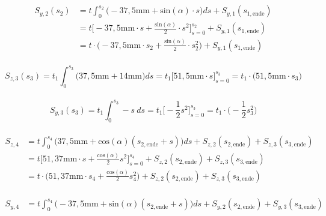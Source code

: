 \begin{itemize}
\begin{equation}
\begin{split}
	\end{split}
\end{equation}\\
\begin{equation}
	\begin{split}
		S_{y,2}(s_2) &= t\int_{0}^{s_2}\bigg(-37,5\mathrm{mm}+\mathrm{sin}(\alpha)\cdot s\bigg)ds + S_{y,1}(s_{1,\mathrm{ende}}) \\\
		&= t\bigg[-37,5\mathrm{mm}\cdot s +\frac{\mathrm{sin}(\alpha)}{2}\cdot s^2\bigg]_{s=0}^{s_2} + S_{y,1}(s_{1,\mathrm{ende}})\\\
		&= t\cdot\bigg(-37,5\mathrm{mm}\cdot s_2 +\frac{\mathrm{sin}(\alpha)}{2}\cdot s^2_2\bigg) + S_{y,1}(s_{1,\mathrm{ende}})
	\end{split}
\end{equation}\\
\begin{equation}
	S_{z,3}(s_3) = t_1\int_{0}^{s_3}\bigg(37,5\mathrm{mm}+14\mathrm{mm}\bigg)ds = t_1\bigg[51,5\mathrm{mm}\cdot s\bigg]_{s=0}^{s_3} = t_1\cdot\bigg(51,5\mathrm{mm}\cdot s_3\bigg)
\end{equation}\\
\begin{equation}
	S_{y,3}(s_3) = t_1\int_{0}^{s_3}-s\ ds= t_1\bigg[-\frac{1}{2}s^2\bigg]_{s=0}^{s_3} = t_1\cdot\bigg(-\frac{1}{2}s^2_3\bigg)
\end{equation}\\
\begin{equation}
\begin{split}
	S_{z,4} &= t\int_{0}^{s_4}\bigg(37,5\mathrm{mm}+\mathrm{cos}(\alpha)(s_{2,\mathrm{ende}}+s)\bigg)ds + S_{z,2}(s_{2,\mathrm{ende}})  + S_{z,3}(s_{3,\mathrm{ende}})\\\
	&= t\bigg[51,37\mathrm{mm}\cdot s + \frac{\mathrm{cos}(\alpha)}{2}s^2\bigg]_{s=0}^{s_4} + S_{z,2}(s_{2,\mathrm{ende}})  + S_{z,3}(s_{3,\mathrm{ende}})\\\
	&= t\cdot\bigg(51,37\mathrm{mm}\cdot s_4 + \frac{\mathrm{cos}(\alpha)}{2}s^2_4\bigg) + S_{z,2}(s_{2,\mathrm{ende}})  + S_{z,3}(s_{3,\mathrm{ende}})
\end{split}
\end{equation}\\
\begin{equation}
\begin{split}
	S_{y,4} &= t\int_{0}^{s_4}\bigg(-37,5\mathrm{mm}+\mathrm{sin}(\alpha)(s_{2,\mathrm{ende}}+s)\bigg)ds + S_{y,2}(s_{2,\mathrm{ende}})  + S_{y,3}(s_{3,\mathrm{ende}})\\\

\end{split}
\end{equation}
\end{itemize}
